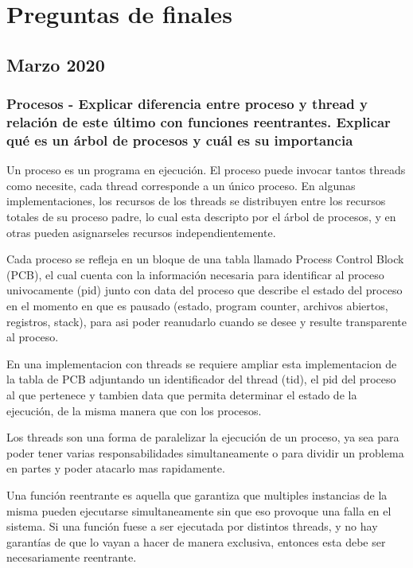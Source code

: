 \section{Preguntas de finales}

\subsection{Marzo 2020}
\subsubsection{Procesos - Explicar diferencia entre proceso y thread y relación de este último con funciones reentrantes. Explicar qué es un árbol de procesos y cuál es su importancia}


Un proceso es un programa en ejecución. El proceso puede invocar tantos threads como necesite, cada thread corresponde a un único proceso. En algunas implementaciones, los recursos de los threads se distribuyen entre los recursos totales de su proceso padre, lo cual esta descripto por el árbol de procesos, y en otras pueden asignarseles recursos independientemente.

Cada proceso se refleja en un bloque de una tabla llamado Process Control Block (PCB), el cual cuenta con la información necesaria para identificar al proceso univocamente (pid) junto con data del proceso que describe el estado del proceso en el momento en que es pausado (estado, program counter, archivos abiertos, registros, stack), para asi poder reanudarlo cuando se desee y resulte transparente al proceso.

En una implementacion con threads se requiere ampliar esta implementacion de la tabla de PCB adjuntando un identificador del thread (tid), el pid del proceso al que pertenece y tambien data que permita determinar el estado de la ejecución, de la misma manera que con los procesos.

Los threads son una forma de paralelizar la ejecución de un proceso, ya sea para poder tener varias responsabilidades simultaneamente o para dividir un problema en partes y poder atacarlo mas rapidamente.

Una función reentrante es aquella que garantiza que multiples instancias de la misma pueden ejecutarse simultaneamente sin que eso provoque una falla en el sistema. Si una función fuese a ser ejecutada por distintos threads, y no hay garantías de que lo vayan a hacer de manera exclusiva, entonces esta debe ser necesariamente reentrante.


